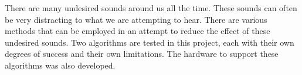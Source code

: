 \thispagestyle{plain}
There are many undesired sounds around us all the time.
These sounds can often be very distracting to what we are attempting to hear.
There are various methods that can be employed in an attempt to reduce the
effect of these undesired sounds.
Two algorithms are tested in this project, each with their own degrees of
success and their own limitations.
The hardware to support these algorithms was also developed.
